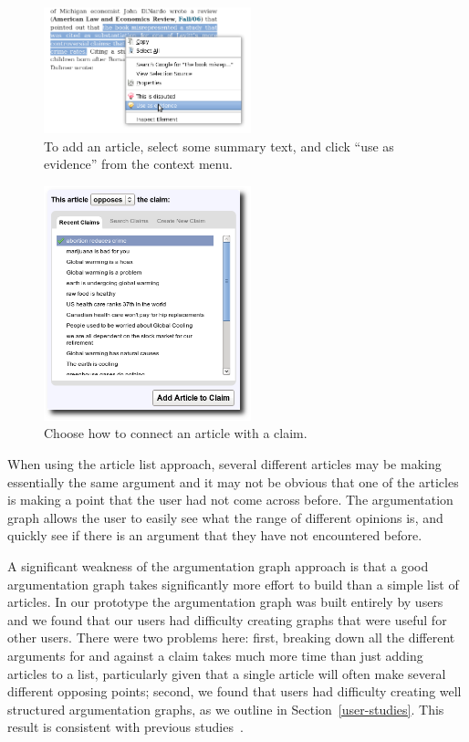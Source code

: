\documentclass{www2010-submission}
\newcommand{\todo}[1]{}
\begin{document}
\begin{figure}[tb]
	\begin{center}
	\includegraphics[width=6cm]{pictures/mark_evidence.png}
	\caption{To add an article, select some summary text, and click ``use as evidence'' from the context menu.}
	\label{add_article}
	\end{center}
\end{figure}

\begin{figure}[tb]
	\begin{center}
	\includegraphics[width=6cm]{pictures/article_choose_claim.png}
	\caption{Choose how to connect an article with a claim.}
	\label{article_choose}
	\end{center}
\end{figure}

\todo{Call them supporting pages? Naming is a mess right now.}

When using the article list approach, several different articles may be making essentially the same argument and it may not be obvious that one of the articles is making a point that the user had not come across before. The argumentation graph allows the user to easily see what the range of different opinions is, and quickly see if there is an argument that they have not encountered before. 

A significant weakness of the argumentation graph approach is that a good argumentation graph takes significantly more effort to build than a simple list of articles. In our prototype the argumentation graph was built entirely by users and we found that our users had difficulty creating graphs that were useful for other users. There were two problems here: first, breaking down all the different arguments for and against a claim takes much more time than just adding articles to a list, particularly given that a single article will often make several different opposing points; second, we found that users had difficulty creating well structured argumentation graphs, as we outline in Section~\ref{user-studies}. This result is consistent with previous studies~\cite{Isenmann1997}.
\end{document}
